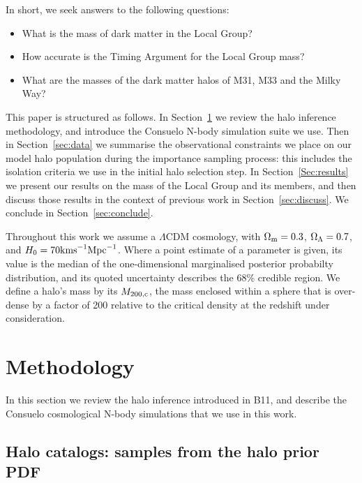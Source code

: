\documentclass{emulateapj}
\newcommand{\LCDM}{$\Lambda$CDM }
\newcommand{\Mpc}{{\rm Mpc}}
\newcommand{\kms}{{\rm km s}^{-1}}
\newcommand{\consuelo}{{\sc Consuelo }}
\def\Sref#1{Section~\ref{#1}}
\begin{document}
In short, we seek answers to the following questions:
\begin{itemize}
\item What is the mass of dark matter in the Local Group?
\item How accurate is the Timing Argument for the Local Group mass?
\item What are the masses of the dark matter halos of M31, M33 and the Milky
Way?
\end{itemize}

This paper is structured as follows. In \Sref{sec:method} we review the
halo inference methodology, and introduce the \consuelo N-body
simulation suite we use. Then in \Sref{sec:data} we summarise the
observational constraints we place on our model halo population during
the importance sampling process: this includes the isolation criteria we
use in the initial halo selection step. In \Sref{Sec:results} we present
our results on the mass of the Local Group and its members, and then
discuss those results in the context of previous work in
\Sref{sec:discuss}. We conclude in \Sref{sec:conclude}.

Throughout this work we assume a \LCDM cosmology, with $\Omega_{\rm m} =
0.3$, $\Omega_{\rm \Lambda} = 0.7$, and $H_0 = 70 \kms \Mpc^{-1}$. Where
a point estimate of a parameter is given, its value is the median of the
one-dimensional marginalised posterior probabilty distribution, and its
quoted uncertainty describes the 68\% credible region.
We define a halo's mass by its $M_{200,\rm c}$, the mass enclosed within a
sphere that is over-dense by a factor of 200 relative to the critical density
at the redshift under consideration.



\section{Methodology}
\label{sec:method}

In this section we review the halo inference introduced in B11, and describe
the \consuelo cosmological N-body simulations that we use in this work.


\subsection{Halo catalogs: samples from the halo prior PDF}
\label{sec:sampling}
\end{document}
